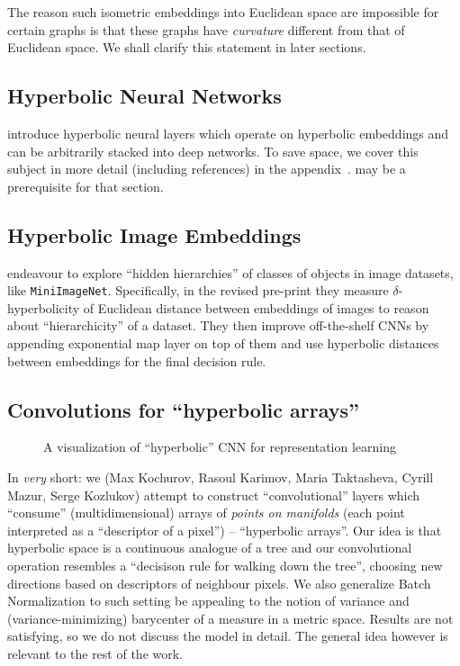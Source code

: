 The reason such isometric embeddings into Euclidean space are impossible for
certain graphs is that these graphs have \emph{curvature} different from that
of Euclidean space. We shall clarify this statement in later sections.

\subsection*{Hyperbolic Neural Networks}

\citet{ganeaHNNs} introduce hyperbolic neural layers which operate on
hyperbolic embeddings and can be arbitrarily stacked into deep networks.  To
save space, we cover this subject in more detail (including references) in the
appendix~.  may be
a prerequisite for that section.

\subsection*{Hyperbolic Image Embeddings}

\citet{khrulkov} endeavour to explore ``hidden hierarchies'' of classes of
objects in image datasets, like \texttt{MiniImageNet}. Specifically, in the
revised pre-print they measure \( \delta \)-hyperbolicity of Euclidean distance
between embeddings of images to reason about ``hierarchicity'' of a dataset.
They then improve off-the-shelf CNNs by appending exponential map layer on top
of them and use hyperbolic distances between embeddings for the final
decision rule.

\subsection{Convolutions for ``hyperbolic arrays''} \label{sec:hconv}

\begin{figure}[ht]\center
{}
\caption{A visualization of ``hyperbolic'' CNN for representation learning}
\end{figure}

In \emph{very} short: we (Max Kochurov, Rasoul Karimov, Maria Taktasheva,
Cyrill Mazur, Serge Kozlukov) attempt to construct ``convolutional'' layers
which ``consume'' (multidimensional) arrays of \emph{points on manifolds} (each
point interpreted as a ``descriptor of a pixel'') -- ``hyperbolic arrays''. Our
idea is that hyperbolic space is a continuous analogue of a tree and our
convolutional operation resembles a ``decisison rule for walking down the
tree'', choosing new directions based on descriptors of neighbour pixels. We
also generalize Batch Normalization to such setting be appealing to the notion
of variance and (variance-minimizing) barycenter of a measure in a metric
space. Results are not satisfying, so we do not discuss the model in detail.
The general idea however is relevant to the rest of the work.


